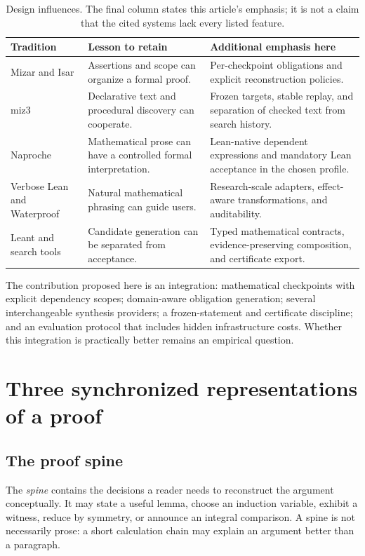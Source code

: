 \documentclass[11pt,a4paper]{article}
\theoremstyle{definition}
\theoremstyle{remark}
\begin{document}
\begin{table}[htbp]
\centering\small
\begin{tabularx}{\linewidth}{@{}L{.19\linewidth}YY@{}}
\toprule
Tradition & Lesson to retain & Additional emphasis here\\
\midrule
Mizar and Isar & Assertions and scope can organize a formal proof. & Per-checkpoint obligations and explicit reconstruction policies.\\
miz3 & Declarative text and procedural discovery can cooperate. & Frozen targets, stable replay, and separation of checked text from search history.\\
Naproche & Mathematical prose can have a controlled formal interpretation. & Lean-native dependent expressions and mandatory Lean acceptance in the chosen profile.\\
Verbose Lean and Waterproof & Natural mathematical phrasing can guide users. & Research-scale adapters, effect-aware transformations, and auditability.\\
Leant and search tools & Candidate generation can be separated from acceptance. & Typed mathematical contracts, evidence-preserving composition, and certificate export.\\
\bottomrule
\end{tabularx}
\caption{Design influences. The final column states this article's emphasis; it is not a claim that the cited systems lack every listed feature.}
\end{table}

The contribution proposed here is an integration: mathematical checkpoints with explicit dependency scopes; domain-aware obligation generation; several interchangeable synthesis providers; a frozen-statement and certificate discipline; and an evaluation protocol that includes hidden infrastructure costs. Whether this integration is practically better remains an empirical question.

\section{Three synchronized representations of a proof}
\label{sec:layers}
\subsection{The proof spine}
The \emph{spine} contains the decisions a reader needs to reconstruct the argument conceptually. It may state a useful lemma, choose an induction variable, exhibit a witness, reduce by symmetry, or announce an integral comparison. A spine is not necessarily prose: a short calculation chain may explain an argument better than a paragraph.
\end{document}
